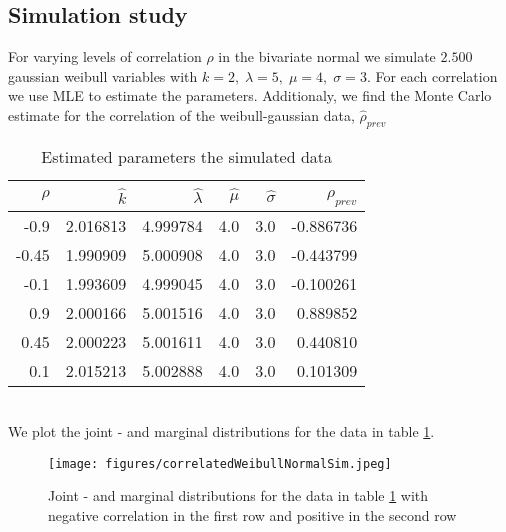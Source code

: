 \subsection{Simulation study}\label{simstudyappendix}
For varying levels of correlation $\rho$ in the bivariate normal we simulate $2.500$ gaussian weibull variables with $k=2, \; \lambda = 5, \; \mu = 4, \; \sigma = 3$. For each correlation we use MLE to estimate the parameters. Additionaly, we find the Monte Carlo estimate for the correlation of the weibull-gaussian data, $\hat{\rho}_{prev}$
\begin{table}[ht]
    \centering
    \begin{tabular}{rrrrrr}
          \hline
          $\rho$ & $\hat{k}$ & $\hat{\lambda}$ & $\hat{\mu}$ & $\hat{\sigma}$ & $\hat{\rho}_{prev}$\\ 
          \hline
        -0.9 & 2.016813 & 4.999784 & 4.0 & 3.0 & -0.886736 \\ 
          -0.45 & 1.990909 & 5.000908 & 4.0& 3.0 & -0.443799 \\ 
          -0.1 & 1.993609 & 4.999045 & 4.0 & 3.0 & -0.100261 \\ 
          0.9 & 2.000166 & 5.001516 & 4.0 & 3.0 & 0.889852 \\ 
          0.45 & 2.000223 & 5.001611 & 4.0 & 3.0 & 0.440810 \\ 
          0.1 & 2.015213 & 5.002888 & 4.0 & 3.0 & 0.101309 \\ 
           \hline
        \end{tabular}
    \caption{Estimated parameters the simulated data}
    \label{correlationTable}
\end{table}\\
We plot the joint - and marginal distributions for the data in table \ref{correlationTable}.
\begin{figure}[h!]
        \begin{center}
        \texttt{[image: figures/correlatedWeibullNormalSim.jpeg]}
        \caption{Joint - and marginal distributions for the data in table \ref{correlationTable} with negative correlation in the first row and positive in the second row}
    \end{center}
    \label{correlationDensities}
\end{figure}

